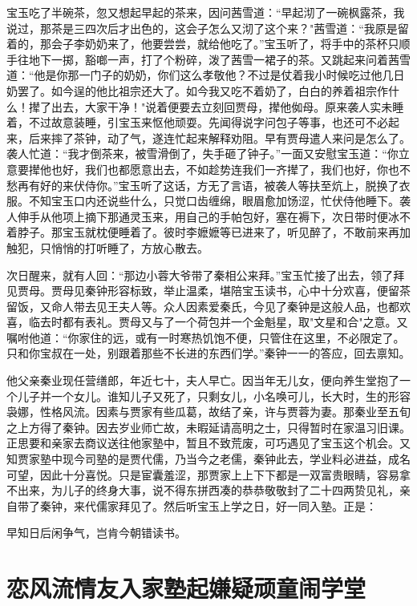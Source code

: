 宝玉吃了半碗茶，忽又想起早起的茶来，因问茜雪道：“早起沏了一碗枫露茶，我说过，那茶是三四次后才出色的，这会子怎么又沏了这个来？"茜雪道：“我原是留着的，那会子李奶奶来了，他要尝尝，就给他吃了。”宝玉听了，将手中的茶杯只顺手往地下一掷，豁啷一声，打了个粉碎，泼了茜雪一裙子的茶。又跳起来问着茜雪道：“他是你那一门子的奶奶，你们这么孝敬他？不过是仗着我小时候吃过他几日奶罢了。如今逞的他比祖宗还大了。如今我又吃不着奶了，白白的养着祖宗作什么！撵了出去，大家干净！"说着便要去立刻回贾母，撵他侞母。原来袭人实未睡着，不过故意装睡，引宝玉来怄他顽耍。先闻得说字问包子等事，也还可不必起来，后来摔了茶钟，动了气，遂连忙起来解释劝阻。早有贾母遣人来问是怎么了。袭人忙道：“我才倒茶来，被雪滑倒了，失手砸了钟子。”一面又安慰宝玉道：“你立意要撵他也好，我们也都愿意出去，不如趁势连我们一齐撵了，我们也好，你也不愁再有好的来伏侍你。”宝玉听了这话，方无了言语，被袭人等扶至炕上，脱换了衣服。不知宝玉口内还说些什么，只觉口齿缠绵，眼眉愈加饧涩，忙伏侍他睡下。袭人伸手从他项上摘下那通灵玉来，用自己的手帕包好，塞在褥下，次日带时便冰不着脖子。那宝玉就枕便睡着了。彼时李嬷嬷等已进来了，听见醉了，不敢前来再加触犯，只悄悄的打听睡了，方放心散去。

次日醒来，就有人回：“那边小蓉大爷带了秦相公来拜。”宝玉忙接了出去，领了拜见贾母。贾母见秦钟形容标致，举止温柔，堪陪宝玉读书，心中十分欢喜，便留茶留饭，又命人带去见王夫人等。众人因素爱秦氏，今见了秦钟是这般人品，也都欢喜，临去时都有表礼。贾母又与了一个荷包并一个金魁星，取"文星和合"之意。又嘱咐他道：“你家住的远，或有一时寒热饥饱不便，只管住在这里，不必限定了。只和你宝叔在一处，别跟着那些不长进的东西们学。”秦钟一一的答应，回去禀知。

他父亲秦业现任营缮郎，年近七十，夫人早亡。因当年无儿女，便向养生堂抱了一个儿子并一个女儿。谁知儿子又死了，只剩女儿，小名唤可儿，长大时，生的形容袅娜，性格风流。因素与贾家有些瓜葛，故结了亲，许与贾蓉为妻。那秦业至五旬之上方得了秦钟。因去岁业师亡故，未暇延请高明之士，只得暂时在家温习旧课。正思要和亲家去商议送往他家塾中，暂且不致荒废，可巧遇见了宝玉这个机会。又知贾家塾中现今司塾的是贾代儒，乃当今之老儒，秦钟此去，学业料必进益，成名可望，因此十分喜悦。只是宦囊羞涩，那贾家上上下下都是一双富贵眼睛，容易拿不出来，为儿子的终身大事，说不得东拼西凑的恭恭敬敬封了二十四两贽见礼，亲自带了秦钟，来代儒家拜见了。然后听宝玉上学之日，好一同入塾。正是：

早知日后闲争气，岂肯今朝错读书。

\chapter{恋风流情友入家塾\ttlbreak 起嫌疑顽童闹学堂}

